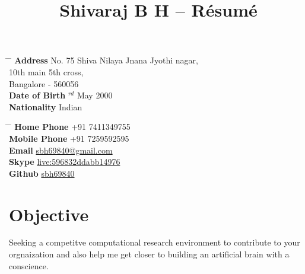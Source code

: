 \documentclass[10pt]{article} %
\begin{document}

\title{Shivaraj B H -- Résumé} %


\parbox{0.5\textwidth}{ %
\begin{tabbing} %
\hspace{3cm} \= \hspace{4cm} \= \kill %
{\bf Address} \> No. 75 Shiva Nilaya Jnana Jyothi nagar,\\ \> 10th main 5th cross,\\ %
\> Bangalore - 560056 \\ %
{\bf Date of Birth} $^{rd}$ May 2000 \\ %
{\bf Nationality} \> Indian %
\end{tabbing}}
\hfill %
\parbox{0.5\textwidth}{ %
\begin{tabbing} %
\hspace{3cm} \= \hspace{4cm} \= \kill %
{\bf Home Phone} \> +91 7411349755 \\ %
{\bf Mobile Phone} \> +91 7259592595\\ %
{\bf Email} \> \href{mailto:sbh69840@gmail.com}{sbh69840@gmail.com} \\ %
{\bf Skype} \> \href{https://join.skype.com/invite/hdfGrS04mvsL}{live:596832ddabb14976} \\ %

{\bf Github} \> \href{https://github.com/sbh69840}{sbh69840} \\ %
\end{tabbing}}


\section{Objective}
Seeking a competitve computational research environment to contribute to your orgnaization and also help me get closer to building an artificial brain with a conscience. 
\end{document}
